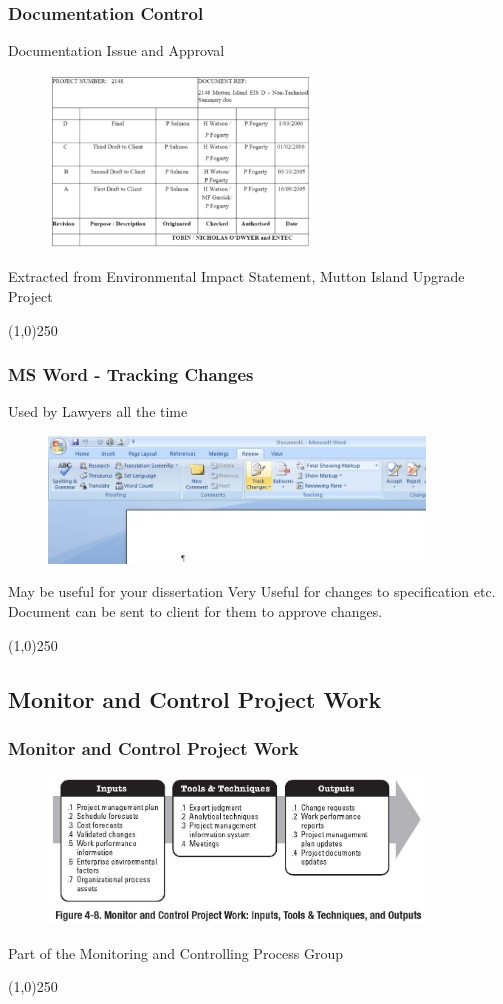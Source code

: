 \begin{frame}
\frametitle{Documentation Control}
Documentation Issue and Approval
\begin{figure}
	\centering
		\includegraphics[width = 7cm]{images/doccontrol.jpg}
	\label{fig:doccontrol}
\end{figure}Extracted from Environmental Impact Statement,  Mutton Island Upgrade Project 
\end{frame}\begin{center}\line(1,0){250}\end{center}
%
%

\begin{frame}
\frametitle{MS Word - Tracking Changes}
Used by Lawyers all the time\begin{figure}
	\centering
		\includegraphics[width = 10cm]{images/trackchg.jpg}
	\label{fig:trackchg}
\end{figure}
May be useful for your dissertation
Very Useful for changes to specification etc.
Document can be sent to client for them to approve changes.
\end{frame}\begin{center}\line(1,0){250}\end{center}
%
%

\subsection{Monitor and Control Project Work}


\begin{frame}
\frametitle{Monitor and Control Project Work}
\begin{figure}
	\centering
		\includegraphics[width = 10cm]{images/Fig4-8.jpg}
	\label{fig:4-8}
\end{figure}Part of the Monitoring and Controlling Process Group
\end{frame}\begin{center}\line(1,0){250}\end{center}
%
%

